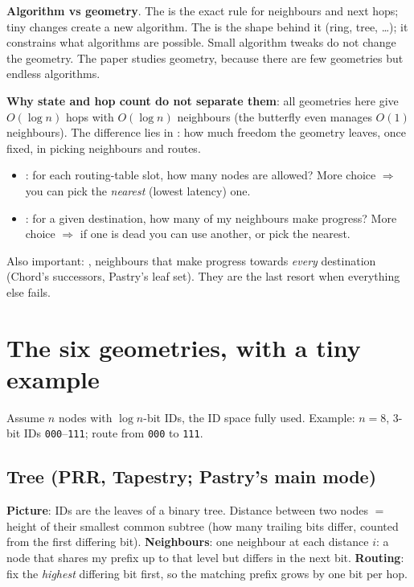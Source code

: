 \textbf{Algorithm vs geometry}. The  is the exact rule for neighbours and next hops; tiny changes create a new algorithm. The
 is the shape behind it (ring, tree, \dots); it constrains what algorithms are possible. Small algorithm tweaks do not change the
geometry. The paper studies geometry, because there are few geometries but endless algorithms.

\textbf{Why state and hop count do not separate them}: all geometries here give $O(\log n)$ hops with $O(\log n)$ neighbours (the butterfly even
manages $O(1)$ neighbours). The difference lies in : how much freedom the geometry leaves, once fixed, in picking neighbours and routes.

\begin{keybox}
\begin{itemize}
  \item {}: for each routing-table slot, how many nodes are allowed? More choice $\Rightarrow$ you can pick the
        \emph{nearest} (lowest latency) one.
  \item {}: for a given destination, how many of my neighbours make progress? More choice $\Rightarrow$ if one is
        dead you can use another, or pick the nearest.
\end{itemize}
Also important: , neighbours that make progress towards \emph{every} destination (Chord's successors, Pastry's leaf set).
They are the last resort when everything else fails.
\end{keybox}

\section{The six geometries, with a tiny example}

Assume $n$ nodes with $\log n$-bit IDs, the ID space fully used. Example: $n = 8$, 3-bit IDs \texttt{000}--\texttt{111}; route from
\texttt{000} to \texttt{111}.

\subsection{Tree (PRR, Tapestry; Pastry's main mode)}
\textbf{Picture}: IDs are the leaves of a binary tree. Distance between two nodes $=$ height of their smallest common subtree (how many trailing
bits differ, counted from the first differing bit).
\textbf{Neighbours}: one neighbour at each distance $i$: a node that shares my prefix up to that level but differs in the next bit.
\textbf{Routing}: fix the \emph{highest} differing bit first, so the matching prefix grows by one bit per hop.

